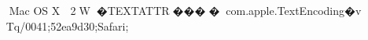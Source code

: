     Mac OS X            	   2  W     �    TEXT                              ATTR      �   �   �                  �     com.apple.TextEncoding      �   v  %
                            Tq/0041;52ea9d30;Safari; 